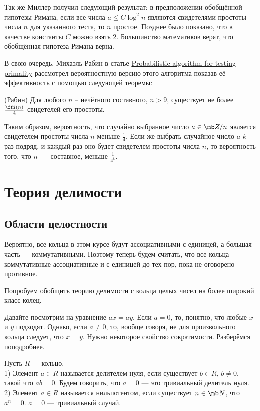 Так же Миллер получил следующий результат: в предположении обобщённой гипотезы Римана, если все числа $a\leq C \log^2 n $ являются свидетелями простоты числа $n$ для указанного теста, то $n$ простое. Позднее было показано, что в качестве константы $C$ можно взять 2. Большинство математиков верят, что обобщённая гипотеза Римана верна.

В свою очередь, Михаэль Рабин в статье \href{https://ac.els-cdn.com/0022314X80900840/1-s2.0-0022314X80900840-main.pdf?_tid=e8201658-e83e-11e7-9793-00000aab0f26&acdnat=1514074434_a1f0bbeeacc3f326abc83943e330aa13}{Probabilistic algorithm for testing primality} рассмотрел вероятностную версию этого алгоритма показав её эффективность с помощью следующей теоремы:


\thrm(Рабин) 
Для любого $n$ -- нечётного составного, $n>9$, существует не более $\frac{\ffi(n)}{4}$ свидетелей его простоты.
\ethrm

Таким образом, вероятность, что случайно выбранное число $a\in\mb Z/n$ является свидетелем простоты числа $n$ меньше $\frac14$. Если же  выбрать случайное число $a$ $k$ раз подряд, и каждый раз оно будет  свидетелем простоты числа $n$, то вероятность того, что $n$~--- составное, меньше $\frac{1}{4^k}$.



\chapter{Теория делимости}

\section{Области целостности}

\rm Вероятно, все кольца в этом курсе будут ассоциативными с единицей, а большая часть --- коммутативными. Поэтому теперь будем считать, что все кольца коммутативные ассоциативные и с единицей до тех пор, пока не оговорено противное.
\erm

Попробуем обобщить теорию делимости с кольца целых чисел на более широкий класс колец.

Давайте посмотрим на уравнение $ax=ay$. Если $a=0$, то, понятно, что любые $x$ и $y$ подходят. Однако, если $a\neq 0$, то, вообще говоря, не для произвольного кольца  следует, что $x=y$. Нужно некоторое свойство сократимости. Разберёмся поподробнее.

 Пусть $R$ --- кольцо.\\
1) Элемент $a\in R$ называется делителем нуля, если существует $b\in R$, $b\neq 0$, такой что $ab=0$. Будем говорить, что
$a=0$ --- это тривиальный делитель нуля.\\
2) Элемент $a\in R$ называется нильпотентом, если существует $n\in \mb N$, что $a^n= 0$. $a= 0$ --- тривиальный случай.
\edfn

